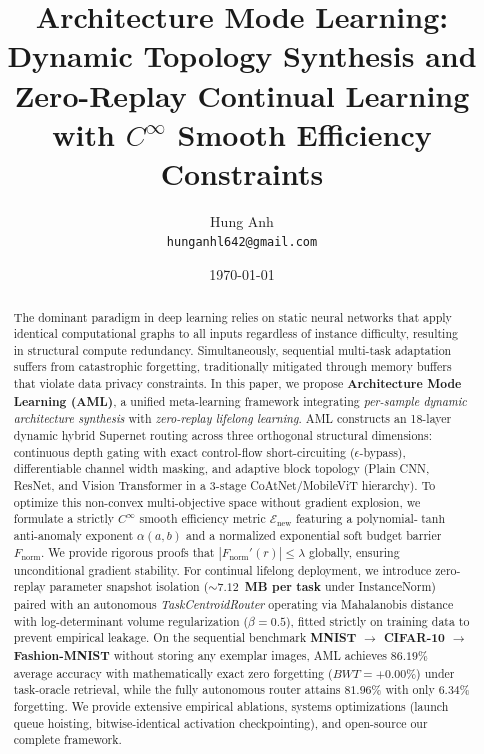 \documentclass[11pt, a4paper]{article}
\title{\textbf{Architecture Mode Learning: Dynamic Topology Synthesis and Zero-Replay Continual Learning with $C^\infty$ Smooth Efficiency Constraints}}
\author{%
  Hung Anh\\
  \texttt{hunganhl642@gmail.com} \\
}
\date{\today}
\begin{document}
\maketitle

\begin{abstract}
The dominant paradigm in deep learning relies on static neural networks that apply identical computational graphs to all inputs regardless of instance difficulty, resulting in structural compute redundancy. Simultaneously, sequential multi-task adaptation suffers from catastrophic forgetting, traditionally mitigated through memory buffers that violate data privacy constraints. In this paper, we propose \textbf{Architecture Mode Learning (AML)}, a unified meta-learning framework integrating \emph{per-sample dynamic architecture synthesis} with \emph{zero-replay lifelong learning}. AML constructs an 18-layer dynamic hybrid Supernet routing across three orthogonal structural dimensions: continuous depth gating with exact control-flow short-circuiting ($\epsilon$-bypass), differentiable channel width masking, and adaptive block topology (Plain CNN, ResNet, and Vision Transformer in a 3-stage CoAtNet/MobileViT hierarchy). To optimize this non-convex multi-objective space without gradient explosion, we formulate a strictly $C^\infty$ smooth efficiency metric $\mathcal{E}_{\text{new}}$ featuring a polynomial-$\tanh$ anti-anomaly exponent $\alpha(a, b)$ and a normalized exponential soft budget barrier $F_{\text{norm}}$. We provide rigorous proofs that $|F_{\text{norm}}'(r)| \le \lambda$ globally, ensuring unconditional gradient stability. For continual lifelong deployment, we introduce zero-replay parameter snapshot isolation ($\sim \mathbf{7.12}$~\textbf{MB per task} under InstanceNorm) paired with an autonomous \emph{TaskCentroidRouter} operating via Mahalanobis distance with log-determinant volume regularization ($\beta=0.5$), fitted strictly on training data to prevent empirical leakage. On the sequential benchmark \textbf{MNIST $\to$ CIFAR-10 $\to$ Fashion-MNIST} without storing any exemplar images, AML achieves $86.19\%$ average accuracy with mathematically exact zero forgetting ($BWT = +0.00\%$) under task-oracle retrieval, while the fully autonomous router attains $81.96\%$ with only $6.34\%$ forgetting. We provide extensive empirical ablations, systems optimizations (launch queue hoisting, bitwise-identical activation checkpointing), and open-source our complete framework.
\end{abstract}

\end{document}
